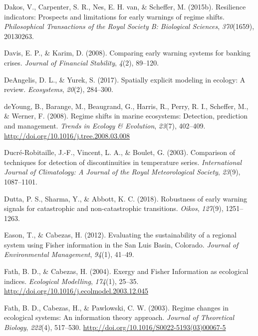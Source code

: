 \documentclass[12pt,twoside,openany]{reedthesis}
\begin{document}
\leavevmode\hypertarget{ref-dakos2015resilience}{}%
Dakos, V., Carpenter, S. R., Nes, E. H. van, \& Scheffer, M. (2015b). Resilience indicators: Prospects and limitations for early warnings of regime shifts. \emph{Philosophical Transactions of the Royal Society B: Biological Sciences}, \emph{370}(1659), 20130263.

\leavevmode\hypertarget{ref-davis_comparing_2008}{}%
Davis, E. P., \& Karim, D. (2008). Comparing early warning systems for banking crises. \emph{Journal of Financial Stability}, \emph{4}(2), 89--120.

\leavevmode\hypertarget{ref-deangelis2017spatially}{}%
DeAngelis, D. L., \& Yurek, S. (2017). Spatially explicit modeling in ecology: A review. \emph{Ecosystems}, \emph{20}(2), 284--300.

\leavevmode\hypertarget{ref-deyoung_regime_2008}{}%
deYoung, B., Barange, M., Beaugrand, G., Harris, R., Perry, R. I., Scheffer, M., \& Werner, F. (2008). Regime shifts in marine ecosystems: Detection, prediction and management. \emph{Trends in Ecology \& Evolution}, \emph{23}(7), 402--409. \url{http://doi.org/10.1016/j.tree.2008.03.008}

\leavevmode\hypertarget{ref-ducre2003comparison}{}%
Ducré-Robitaille, J.-F., Vincent, L. A., \& Boulet, G. (2003). Comparison of techniques for detection of discontinuities in temperature series. \emph{International Journal of Climatology: A Journal of the Royal Meteorological Society}, \emph{23}(9), 1087--1101.

\leavevmode\hypertarget{ref-dutta2018robustness}{}%
Dutta, P. S., Sharma, Y., \& Abbott, K. C. (2018). Robustness of early warning signals for catastrophic and non-catastrophic transitions. \emph{Oikos}, \emph{127}(9), 1251--1263.

\leavevmode\hypertarget{ref-eason_evaluating_2012}{}%
Eason, T., \& Cabezas, H. (2012). Evaluating the sustainability of a regional system using Fisher information in the San Luis Basin, Colorado. \emph{Journal of Environmental Management}, \emph{94}(1), 41--49.

\leavevmode\hypertarget{ref-fath_exergy_2004}{}%
Fath, B. D., \& Cabezas, H. (2004). Exergy and Fisher Information as ecological indices. \emph{Ecological Modelling}, \emph{174}(1), 25--35. \url{http://doi.org/10.1016/j.ecolmodel.2003.12.045}

\leavevmode\hypertarget{ref-fath_regime_2003}{}%
Fath, B. D., Cabezas, H., \& Pawlowski, C. W. (2003). Regime changes in ecological systems: An information theory approach. \emph{Journal of Theoretical Biology}, \emph{222}(4), 517--530. \url{http://doi.org/10.1016/S0022-5193(03)00067-5}
\end{document}
